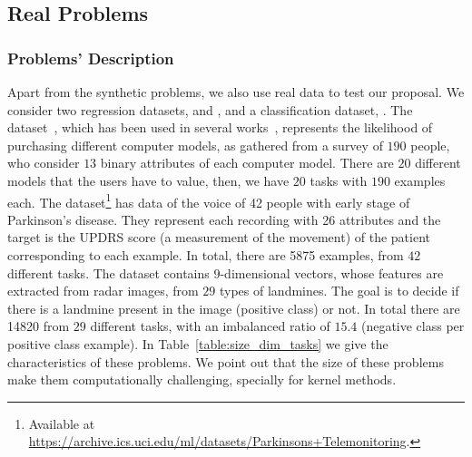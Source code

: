 \subsection{Real Problems}

\subsubsection*{Problems' Description}

%

%

Apart from the synthetic problems, we also use real data to test our proposal. We consider two regression datasets,  and , and a classification dataset, .
%
The  dataset~\cite{Lenk96}, which has been used in several works~\citep{ArgyriouEP08,AgarwalDG10,KumarD12,JeongJ18}, represents the likelihood of purchasing different computer models, as gathered from a survey of $190$ people, who consider $13$ binary attributes of each computer model. There are $20$ different models that the users have to value, then, we have $20$ tasks with $190$ examples each.
%
The  dataset\footnote{Available at \url{https://archive.ics.uci.edu/ml/datasets/Parkinsons+Telemonitoring}.} has data of the voice of 42 people with early stage of Parkinson's disease. They represent each recording with 26 attributes and the target is the UPDRS score (a measurement of the movement) of the patient corresponding to each example. 
In total, there are \num{5875} examples, from $42$ different tasks.
%
The  dataset contains $9$-dimensional vectors, whose features are extracted from radar images, from $29$ types of landmines. The goal is to decide if there is a landmine present in the image (positive class) or not. In total there are \num{14820} from $29$ different tasks, with an imbalanced ratio of $15.4$ (negative class per positive class example).
%
In Table~\ref{table:size_dim_tasks} we give the characteristics of these problems.
We point out that the size of these problems make them computationally challenging, specially for kernel methods.


\begin{table*}[t!]
    \caption{Sample sizes, dimensions and number of tasks of the datasets used.}
    \label{table:size_dim_tasks}
    \centering
\end{table*}


